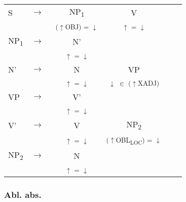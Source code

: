 \documentclass[12pt,a4paper]{article}
\begin{document}
\begin{singlespace}
\begin{tabular}{ l  l  c  c  c  c }
  S & $\rightarrow$ & NP\textsubscript{1} & V\\
   & $\qquad$ & \textsuperscript{($\uparrow$OBJ) = $\downarrow$} & \textsuperscript{$\uparrow$ = $\downarrow$} \\
    NP\textsubscript{1} & $\rightarrow$ & N' \\
   & $\qquad$ & \textsuperscript{$\uparrow$ = $\downarrow$} \\
       N' & $\rightarrow$ & N & VP \\
   & $\qquad$ & \textsuperscript{$\uparrow$ = $\downarrow$} & \textsuperscript{$\downarrow$ $\in$ ($\uparrow$XADJ)} \\
		    VP & $\rightarrow$ & V' \\
   & $\qquad$ & \textsuperscript{$\uparrow$ = $\downarrow$} \\
  				  V' & $\rightarrow$ & V & NP\textsubscript{2} \\
   & $\qquad$ & \textsuperscript{$\uparrow$ = $\downarrow$} & \textsuperscript{($\uparrow$OBL\textsubscript{LOC}) = $\downarrow$ }  \\
   					 NP\textsubscript{2} & $\rightarrow$ & N \\
   & $\qquad$ & \textsuperscript{$\uparrow$ = $\downarrow$} \\
\end{tabular} 
\end{singlespace}


\subsubsection{Abl. abs.}


\end{document}
